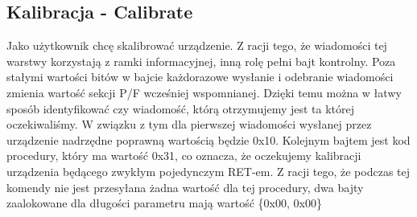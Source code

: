 		\subsection{Kalibracja - Calibrate}
			Jako użytkownik chcę skalibrować urządzenie.
			\newline\newline
			Z racji tego, że wiadomości tej warstwy korzystają z ramki informacyjnej, inną rolę pełni bajt kontrolny. Poza stałymi wartości bitów w bajcie 
			każdorazowe wysłanie i odebranie wiadomości zmienia wartość sekcji P/F wcześniej wspomnianej. 
			Dzięki temu można w łatwy sposób identyfikować czy wiadomość, którą otrzymujemy jest ta której oczekiwaliśmy. 
			W związku z tym dla pierwszej wiadomości wysłanej przez urządzenie nadrzędne poprawną wartością będzie 0x10.
			\newline
			Kolejnym bajtem jest kod procedury, który ma wartość 0x31, co oznacza, że oczekujemy kalibracji urządzenia będącego zwykłym pojedynczym RET-em.
			\newline
			Z racji tego, że podczas tej komendy nie jest przesyłana żadna wartość dla tej procedury, dwa bajty zaalokowane dla długości parametru mają wartość \{0x00, 0x00\}
